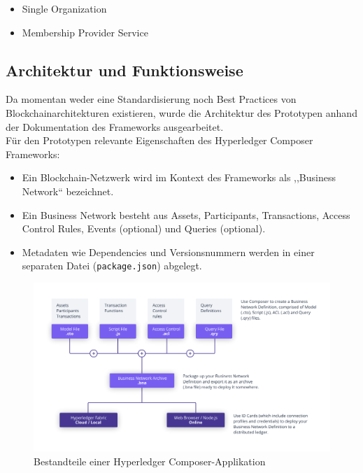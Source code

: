         \begin{itemize}[noitemsep]
            \item Single Organization 
            \item Membership Provider Service
        \end{itemize}
    
\subsection{Architektur und Funktionsweise}
\label{sec:prototype_arch} 
    Da momentan weder eine Standardisierung noch Best Practices von Blockchainarchitekturen existieren, wurde die Architektur des Prototypen anhand der Dokumentation des Frameworks\cite{ComposerDocs}  ausgearbeitet.
    \medskip\\
    \noindent Für den Prototypen relevante Eigenschaften des Hyperledger Composer Frameworks:
    \begin{itemize}[noitemsep]
        \item Ein Blockchain-Netzwerk wird im Kontext des Frameworks als ,,Business Network`` bezeichnet. 
        \item Ein Business Network besteht aus Assets, Participants, Transactions, Access Control Rules, Events (optional) und Queries (optional).
        \item Metadaten wie Dependencies und Versionsnummern werden in einer separaten Datei (\colorbox{light-gray}{\lstinline|package.json|}) abgelegt.
    \end{itemize}
    
    \begin{figure}[H]
		\centering
		\includegraphics[width=\textwidth]{graphics/Composer-Diagram.png}
		\caption[Bestandteile einer Hyperledger Composer-Applikation]{Bestandteile einer Hyperledger Composer-Applikation\cite{ComposerDocs}}
		\label{fig:composer_arch}
	\end{figure}
    
